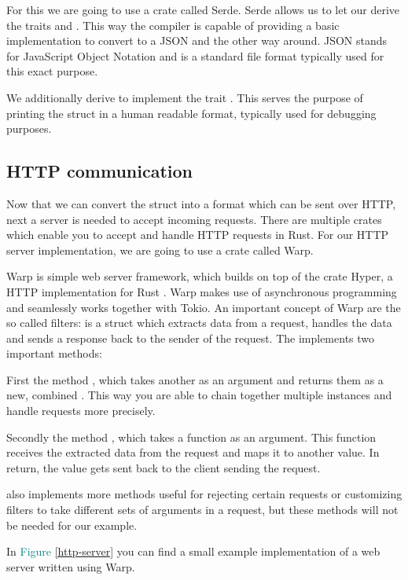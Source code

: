 For this we are going to use a crate called Serde. Serde allows us to let our  derive the traits
 and . This way the compiler is capable of providing a basic implementation to
convert  to a JSON  and the other way around. JSON stands for JavaScript Object Notation and is
a standard file format typically used for this exact purpose.

We additionally derive  to implement the trait . This serves the purpose of printing
the struct in a human readable format, typically used for debugging purposes.

\subsection{HTTP communication}
Now that we can convert the struct into a format which can be sent over HTTP, next a server is needed to accept
incoming requests. There are multiple crates which enable you to accept and handle HTTP requests in Rust. For our HTTP
server implementation, we are going to use a crate called Warp.

Warp is simple web server framework, which builds on top of the crate Hyper, a HTTP implementation for Rust
\cite{warp-doc}. Warp makes use of asynchronous programming and seamlessly works together with Tokio. An important
concept of Warp are the so called filters:  is a struct which extracts data from a request, handles
the data and sends a response back to the sender of the request. The  implements two important methods:

First the method , which takes another  as an argument and returns
them as a new, combined . This way you are able to chain together multiple  instances and
handle requests more precisely.

Secondly the method , which takes a function as an argument. This function receives the extracted data from
the request and maps it to another value. In return, the value gets sent back to the client sending the request.

 also implements more methods useful for rejecting certain requests or customizing filters to take
different sets of arguments in a request, but these methods will not be needed for our example.

In \textcolor{teal}{Figure \ref{http-server}} you can find a small example implementation of a web server written using Warp.

